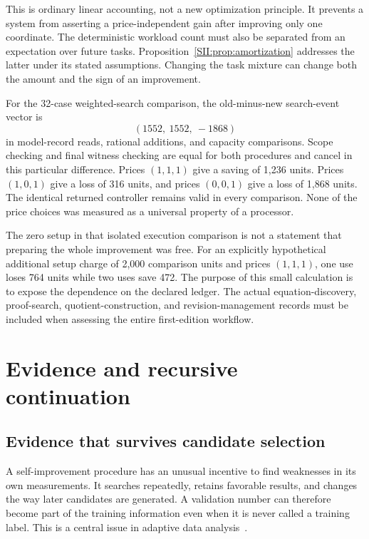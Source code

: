 This is ordinary linear accounting, not a new optimization principle. It prevents a system from asserting a price-independent gain after improving only one coordinate. The deterministic workload count must also be separated from an expectation over future tasks. Proposition~\ref{SII:prop:amortization} addresses the latter under its stated assumptions. Changing the task mixture can change both the amount and the sign of an improvement.

\begin{SIIcounterexample}\label{SII:ex:price-change}
For the 32-case weighted-search comparison, the old-minus-new search-event vector is
\[
 (1552,\ 1552,\ -1868)
\]
in model-record reads, rational additions, and capacity comparisons. Scope checking and final witness checking are equal for both procedures and cancel in this particular difference. Prices $(1,1,1)$ give a saving of 1,236 units. Prices $(1,0,1)$ give a loss of 316 units, and prices $(0,0,1)$ give a loss of 1,868 units. The identical returned controller remains valid in every comparison. None of the price choices was measured as a universal property of a processor.
\end{SIIcounterexample}

The zero setup in that isolated execution comparison is not a statement that preparing the whole improvement was free. For an explicitly hypothetical additional setup charge of 2,000 comparison units and prices $(1,1,1)$, one use loses 764 units while two uses save 472. The purpose of this small calculation is to expose the dependence on the declared ledger. The actual equation-discovery, proof-search, quotient-construction, and revision-management records must be included when assessing the entire first-edition workflow.


\chapter{Evidence and recursive continuation}\label{SII:book:chapter-65}

\section{Evidence that survives candidate selection}\label{SII:sec:evidence}
A self-improvement procedure has an unusual incentive to find weaknesses in its own measurements. It searches repeatedly, retains favorable results, and changes the way later candidates are generated. A validation number can therefore become part of the training information even when it is never called a training label. This is a central issue in adaptive data analysis~\cite{SII:dwork}.

